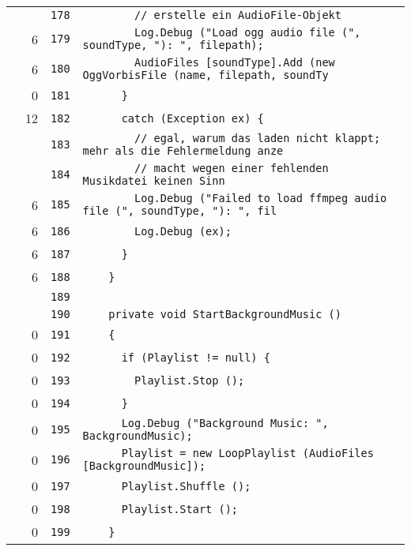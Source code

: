 \documentclass[a4paper,10pt]{article}
\begin{document}
\begin{longtable}[l]{lrrl}
\cellcolor{gray} &  & \verb~178~ & \verb~        // erstelle ein AudioFile-Objekt~\\
\cellcolor{green} & 6 & \verb~179~ & \verb~        Log.Debug ("Load ogg audio file (", soundType, "): ", filepath);~\\
\cellcolor{green} & 6 & \verb~180~ & \verb~        AudioFiles [soundType].Add (new OggVorbisFile (name, filepath, soundTy~\\
\cellcolor{red} & 0 & \verb~181~ & \verb~      }~\\
\cellcolor{green} & 12 & \verb~182~ & \verb~      catch (Exception ex) {~\\
\cellcolor{gray} &  & \verb~183~ & \verb~        // egal, warum das laden nicht klappt; mehr als die Fehlermeldung anze~\\
\cellcolor{gray} &  & \verb~184~ & \verb~        // macht wegen einer fehlenden Musikdatei keinen Sinn~\\
\cellcolor{green} & 6 & \verb~185~ & \verb~        Log.Debug ("Failed to load ffmpeg audio file (", soundType, "): ", fil~\\
\cellcolor{green} & 6 & \verb~186~ & \verb~        Log.Debug (ex);~\\
\cellcolor{green} & 6 & \verb~187~ & \verb~      }~\\
\cellcolor{green} & 6 & \verb~188~ & \verb~    }~\\
\cellcolor{gray} &  & \verb~189~ & \verb~~\\
\cellcolor{gray} &  & \verb~190~ & \verb~    private void StartBackgroundMusic ()~\\
\cellcolor{red} & 0 & \verb~191~ & \verb~    {~\\
\cellcolor{red} & 0 & \verb~192~ & \verb~      if (Playlist != null) {~\\
\cellcolor{red} & 0 & \verb~193~ & \verb~        Playlist.Stop ();~\\
\cellcolor{red} & 0 & \verb~194~ & \verb~      }~\\
\cellcolor{red} & 0 & \verb~195~ & \verb~      Log.Debug ("Background Music: ", BackgroundMusic);~\\
\cellcolor{red} & 0 & \verb~196~ & \verb~      Playlist = new LoopPlaylist (AudioFiles [BackgroundMusic]);~\\
\cellcolor{red} & 0 & \verb~197~ & \verb~      Playlist.Shuffle ();~\\
\cellcolor{red} & 0 & \verb~198~ & \verb~      Playlist.Start ();~\\
\cellcolor{red} & 0 & \verb~199~ & \verb~    }~\\

\end{longtable}
\end{document}
